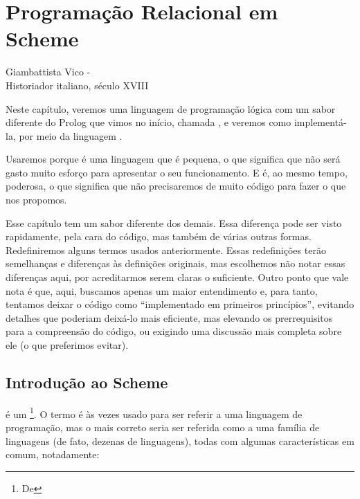 \documentclass{article}
\begin{document}
\section{Programação Relacional em Scheme}

\epigraph{}{Giambattista Vico - \\Historiador italiano, século XVIII}


Neste capítulo, veremos uma linguagem de programação lógica com um
sabor diferente do Prolog que vimos no início, chamada
, e veremos como implementá-la, por meio da
linguagem .

Usaremos  porque é uma linguagem que é pequena, o
que significa que não será gasto muito esforço para apresentar o seu
funcionamento. E é, ao mesmo tempo, poderosa, o que significa que não
precisaremos de muito código para fazer o que nos propomos.

Esse capítulo tem um sabor diferente dos demais. Essa diferença pode ser visto
rapidamente, pela cara do código, mas também de várias outras
formas. Redefiniremos alguns termos usados anteriormente. Essas
redefinições terão semelhanças e diferenças às definições originais,
mas escolhemos não notar essas diferenças aqui, por acreditarmos serem
claras o suficiente. Outro ponto que vale nota é que, aqui, buscamos
apenas um maior entendimento e, para tanto, tentamos deixar o código
como ``implementado em primeiros princípios'', evitando detalhes que
poderiam deixá-lo mais eficiente, mas elevando os prerrequisitos para
a compreensão do código, ou exigindo uma discussão mais completa sobre
ele (o que preferimos evitar).

\subsection{Introdução ao Scheme}

 é um \footnote{De
  }. O termo  é às vezes
usado para ser referir a uma linguagem de programação, mas o mais
correto seria ser referida como a uma família de linguagens (de fato,
dezenas de linguagens), todas com algumas características em comum,
notadamente:
\end{document}
